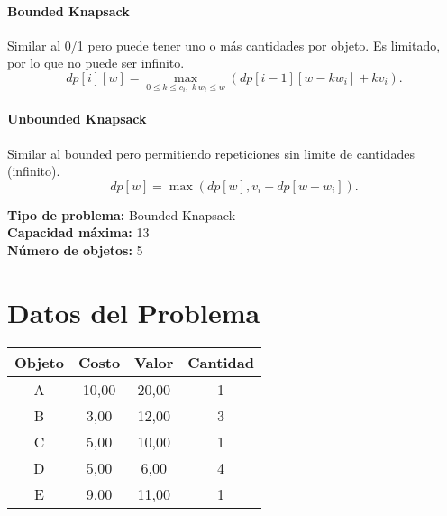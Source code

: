 \documentclass{article}
\begin{document}
\paragraph{Bounded Knapsack} Similar al 0/1 pero puede tener uno o más cantidades por objeto. Es limitado, por lo que no puede ser infinito.
\[
dp[i][w] = 
\max_{0 \leq k \leq c_i,\; k\,w_i \leq w} \left( dp[i-1][w - k w_i] + k v_i \right).
\]

\paragraph{Unbounded Knapsack} Similar al bounded pero permitiendo repeticiones sin limite de cantidades (infinito).
\[
dp[w] = \max ( dp[w], v_i + dp[w - w_i] ).
\]

\thispagestyle{empty}
\newpage
\textbf{Tipo de problema:} Bounded Knapsack\\
\textbf{Capacidad máxima:} 13\\
\textbf{Número de objetos:} 5\\

\section*{Datos del Problema}
\begin{tabular}{|c|c|c|c|}
\hline
Objeto & Costo & Valor & Cantidad \\
\hline
A & 10,00 & 20,00 & 1 \\
B & 3,00 & 12,00 & 3 \\
C & 5,00 & 10,00 & 1 \\
D & 5,00 & 6,00 & 4 \\
E & 9,00 & 11,00 & 1 \\
\hline
\end{tabular}
\end{document}
